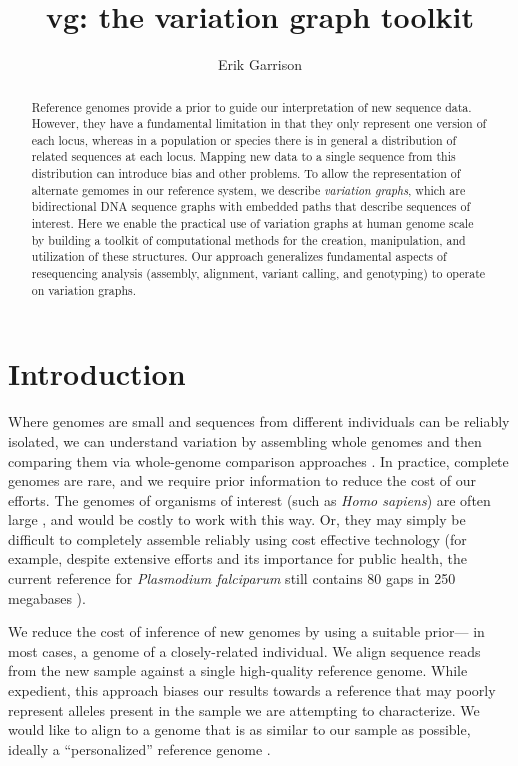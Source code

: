\documentclass{article}
\begin{document}
\title{vg: the variation graph toolkit}

\author{Erik Garrison}

\maketitle

\begin{abstract}
Reference genomes provide a prior to guide our interpretation of new sequence data.
However, they have a fundamental limitation in that they only represent one version of each locus, whereas
in a population or species there is in general a distribution of related sequences at each locus.
Mapping new data to a single sequence from this distribution can introduce bias and other problems.
To allow the representation of alternate gemomes in our reference system, we describe \emph{variation graphs}, which are bidirectional DNA sequence graphs with embedded paths that describe sequences of interest.
Here we enable the practical use of variation graphs at human genome scale
by building a toolkit of computational methods for the creation, manipulation, and utilization of these structures.
Our approach generalizes fundamental aspects of resequencing analysis (assembly, alignment, variant calling, and genotyping) to operate on variation graphs.
\end{abstract}

\section{Introduction}

Where genomes are small and sequences from different individuals can be reliably isolated, we can understand variation by assembling whole genomes and then comparing them via whole-genome comparison approaches \cite{mummer}.
In practice, complete genomes are rare, and we require prior information to reduce the cost of our efforts.
The genomes of organisms of interest (such as \emph{Homo sapiens}) are often large \cite{pmid11237011}, and would be costly to work with this way.
Or, they may simply be difficult to completely assemble reliably using cost effective technology (for example, despite extensive efforts and its importance for public health, the current reference for \emph{Plasmodium falciparum} still contains 80 gaps in 250 megabases \cite{pfalciparum, pfalciparumweb}).

We reduce the cost of inference of new genomes by using a suitable prior--- in most cases, a genome of a closely-related individual.
We align sequence reads from the new sample against a single high-quality reference genome.
While expedient, this approach biases our results towards a reference that may poorly represent alleles present in the sample we are attempting to characterize.
We would like to align to a genome that is as similar to our sample as possible, ideally a ``personalized'' reference genome \cite{Yuan_2012}.
\end{document}
